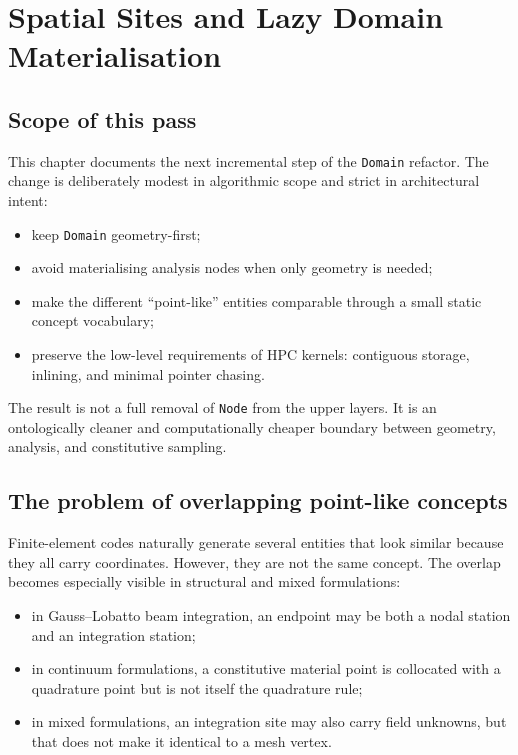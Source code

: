 \chapter{Spatial Sites and Lazy Domain Materialisation}

\section{Scope of this pass}

This chapter documents the next incremental step of the \texttt{Domain}
refactor.  The change is deliberately modest in algorithmic scope and strict in
architectural intent:
\begin{itemize}[nosep]
  \item keep \texttt{Domain} geometry-first;
  \item avoid materialising analysis nodes when only geometry is needed;
  \item make the different ``point-like'' entities comparable through a small
        static concept vocabulary;
  \item preserve the low-level requirements of HPC kernels: contiguous storage,
        inlining, and minimal pointer chasing.
\end{itemize}

The result is not a full removal of \texttt{Node} from the upper layers.  It is
an ontologically cleaner and computationally cheaper boundary between geometry,
analysis, and constitutive sampling.

\section{The problem of overlapping point-like concepts}

Finite-element codes naturally generate several entities that look similar
because they all carry coordinates.  However, they are not the same concept.
The overlap becomes especially visible in structural and mixed formulations:
\begin{itemize}[nosep]
  \item in Gauss--Lobatto beam integration, an endpoint may be both a nodal
        station and an integration station;
  \item in continuum formulations, a constitutive material point is collocated
        with a quadrature point but is not itself the quadrature rule;
  \item in mixed formulations, an integration site may also carry field
        unknowns, but that does not make it identical to a mesh vertex.
\end{itemize}

